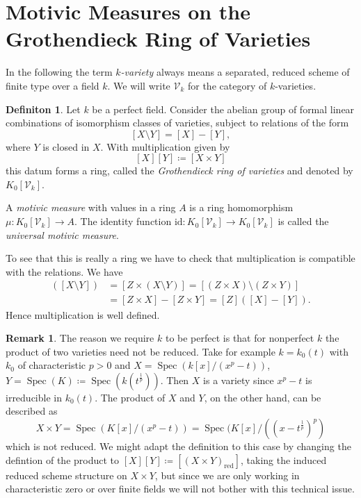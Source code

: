\documentclass[11pt, a4paper, german]{article}
\theoremstyle{plain}
\theoremstyle{definition}
\newtheorem{definition}[theorem]{Definiton}
\newtheorem{remark}[theorem]{Remark}
\newcommand{\gring}[1][k]{K_0[\mathcal{V}_#1]}
\DeclareMathOperator{\Spec}{Spec}
\begin{document}
\section{Motivic Measures on the Grothendieck Ring of Varieties}
\label{sec1}
In the following the term \emph{$k$-variety} always means a separated, reduced scheme of finite type over a field $k$.
We will write $\mathcal{V}_k$ for the category of $k$-varieties. 

\begin{definition}
    \label{gringdef}
    Let $k$ be a perfect field. 
    Consider the abelian group of formal linear combinations of isomorphism classes of varieties, subject to relations of the form
    \[
        [X \setminus Y] = [X] - [Y],
    \] where $Y$ is closed in $X$.
    With multiplication given by
    \[
        [X][Y] \coloneqq [X \times Y]
    \]
    this datum forms a ring, called the \emph{Grothendieck ring of varieties} and denoted by $\gring$. 
    
    A \emph{motivic measure} with values in a ring $A$ is a ring homomorphism $\mu \colon \gring \to A$. The identity function
    $\mathrm{id} \colon \gring \to \gring$ is called the \emph{universal motivic measure}.
\end{definition}

To see that this is really a ring we have to check that multiplication is compatible with the relations. We have
\begin{align*}
    [Z] ([X \setminus Y])   &= [Z \times (X \setminus Y)] = [(Z \times X) \setminus (Z \times Y)] \\
                            &= [Z \times X] - [Z \times Y] = [Z]([X] - [Y]).
\end{align*}
Hence multiplication is well defined.

\begin{remark}
The reason we require $k$ to be perfect is that for nonperfect $k$ the product of two varieties need not be reduced. Take for example
$k = k_0(t)$ with $k_0$ of characteristic $p > 0$ and $X = \Spec(k[x]/(x^p - t))$, $Y = \Spec(K) \coloneqq \Spec(k(t^{\frac{1}{p}}))$. 
Then $X$ is a variety since $x^p - t$ is irreducible in $k_0(t)$. The product of $X$ and $Y$, on the other hand, can be described as
    \[
        X \times Y = \Spec(K[x]/(x^p - t)) = \Spec(K[x]/((x-t^{\frac{1}{p}})^p)
    \]
which is not reduced. We might adapt the definition to this case by changing the defintion of the product to 
$[X][Y] \coloneqq [(X \times Y)_{\text{red}}]$, taking the induced reduced scheme structure on $X \times Y$, but since we are only working
in characteristic zero or over finite fields we will not bother with this technical issue.
\end{remark}
\end{document}
